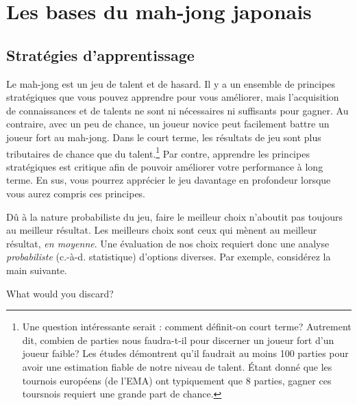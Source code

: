 \chapter{Les bases du mah-jong japonais}\label{ch:basic}
\thispagestyle{empty}

\section{Stratégies d’apprentissage}

Le mah-jong est un jeu de talent et de hasard. 
Il y a un ensemble de principes stratégiques que vous pouvez apprendre pour vous améliorer, mais l'acquisition de connaissances et de talents ne sont ni nécessaires ni suffisants pour gagner. Au contraire, avec un peu de chance, un joueur novice peut facilement battre un joueur fort au mah-jong. Dans le court terme, les résultats de jeu sont plus tributaires  de chance que du talent.\footnote{Une question intéressante serait : comment définit-on court terme? Autrement dit, combien de parties nous faudra-t-il pour discerner un joueur fort d'un joueur faible? Les études démontrent qu'il faudrait au moins 100 parties pour avoir une estimation fiable de notre niveau de talent. Étant donné que les tournois européens (de l'EMA) ont typiquement que 8 parties, gagner ces toursnois requiert une grande part de chance.}
Par contre, apprendre les principes stratégiques est critique afin de pouvoir améliorer votre performance à long terme. En sus, vous pourrez apprécier le jeu davantage en profondeur lorsque vous aurez compris ces principes. 

\bigskip
Dû à la nature probabiliste du jeu, faire le meilleur choix n'aboutit pas toujours au meilleur résultat. Les meilleurs choix sont ceux qui mènent au meilleur résultat, \emph{en moyenne}. Une évaluation de nos choix requiert donc une analyse \emph{probabiliste} (c.-à-d. statistique) d'options diverses. Par exemple, considérez la main suivante. 
\vspace{5pt}
\begin{screen}
\bp
{}
\fa\fa\rfa
\ep
\vspace{-10pt}What would you discard? \vspace{-5pt}
\end{screen}

